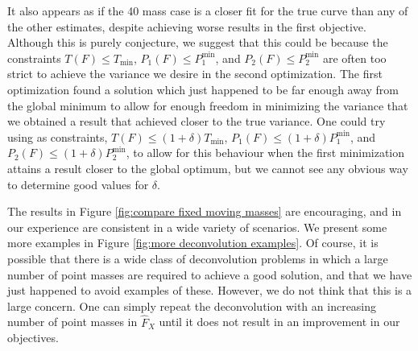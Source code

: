 It also appears as if the 40 mass case is a closer fit for the true curve than any of the other estimates, despite achieving worse results in the first objective. Although this is purely conjecture, we suggest that this could be because the constraints $T(F) \leq T_\mathrm{min}$, $P_1(F) \leq P_1^\mathrm{min}$, and $P_2(F) \leq P_2^\mathrm{min}$ are often too strict to achieve the variance we desire in the second optimization. The first optimization found a solution which just happened to be far enough away from the global minimum to allow for enough freedom in minimizing the variance that we obtained a result that achieved closer to the true variance. One could try using as constraints, $T(F) \leq (1 + \delta) T_\mathrm{min}$, $P_1(F) \leq (1 + \delta) P_1^\mathrm{min}$, and $P_2(F) \leq (1 + \delta) P_2^\mathrm{min}$, to allow for this behaviour when the first minimization attains a result closer to the global optimum, but we cannot see any obvious way to determine good values for $\delta$.

The results in Figure \ref{fig:compare fixed moving masses} are encouraging, and in our experience are consistent in a wide variety of scenarios. We present some more examples in Figure \ref{fig:more deconvolution examples}. Of course, it is possible that there is a wide class of deconvolution problems in which a large number of point masses are required to achieve a good solution, and that we have just happened to avoid examples of these. However, we do not think that this is a large concern. One can simply repeat the deconvolution with an increasing number of point masses in $\hat{F}_X$ until it does not result in an improvement in our objectives.


